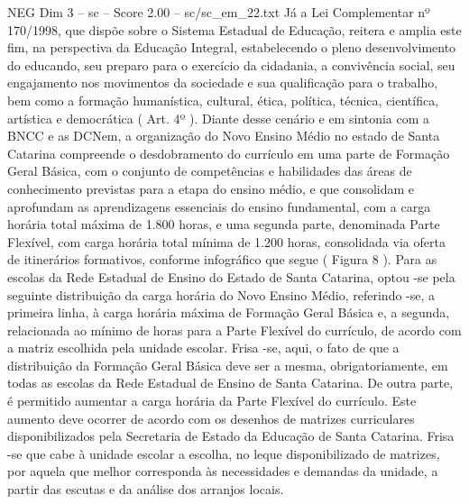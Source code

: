 \begin{textsample}{NEG Dim 3 – sc – Score 2.00 – sc/sc\_em\_22.txt}
Já a Lei Complementar nº 170/1998, que dispõe sobre o Sistema Estadual de Educação, reitera e amplia este fim, na perspectiva da Educação Integral, estabelecendo o pleno desenvolvimento do educando, seu preparo para o exercício da cidadania, a convivência social, seu engajamento nos movimentos da sociedade e sua qualificação para o trabalho, bem como a formação humanística, cultural, ética, política, técnica, científica, artística e democrática ( Art. 4º ).
Diante desse cenário e em sintonia com a BNCC e as DCNem, a organização do Novo Ensino Médio no estado de Santa Catarina compreende o desdobramento do currículo em uma parte de Formação Geral Básica, com o conjunto de competências e habilidades das áreas de conhecimento previstas para a etapa do ensino médio, e que consolidam e aprofundam as aprendizagens essenciais do ensino fundamental, com a carga horária total máxima de 1.800 horas, e uma segunda parte, denominada Parte Flexível, com carga horária total mínima de 1.200 horas, consolidada via oferta de itinerários formativos, conforme infográfico que segue ( Figura 8 ).
Para as escolas da Rede Estadual de Ensino do Estado de Santa Catarina, optou -se pela seguinte distribuição da carga horária do Novo Ensino Médio, referindo -se, a primeira linha, à carga horária máxima de Formação Geral Básica e, a segunda, relacionada ao mínimo de horas para a Parte Flexível do currículo, de acordo com a matriz escolhida pela unidade escolar.
Frisa -se, aqui, o fato de que a distribuição da Formação Geral Básica deve ser a mesma, obrigatoriamente, em todas as escolas da Rede Estadual de Ensino de Santa Catarina.
De outra parte, é permitido aumentar a carga horária da Parte Flexível do currículo.
Este aumento deve ocorrer de acordo com os desenhos de matrizes curriculares disponibilizados pela Secretaria de Estado da Educação de Santa Catarina.
Frisa -se que cabe à unidade escolar a escolha, no leque disponibilizado de matrizes, por aquela que melhor corresponda às necessidades e demandas da unidade, a partir das escutas e da análise dos arranjos locais.

\end{textsample}
